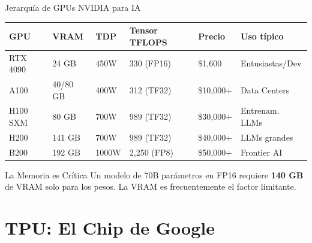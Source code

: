 \documentclass[aspectratio=169]{beamer}
\begin{document}
\begin{frame}{Jerarquía de GPUs NVIDIA para IA}
    \begin{table}[]
        \centering
        \renewcommand{\arraystretch}{1.3}
        \scriptsize
        \begin{tabular}{p{2.2cm} p{1.8cm} p{1.5cm} p{2.2cm} p{2cm} p{2cm}}
            \toprule
            \textbf{GPU} & \textbf{VRAM} & \textbf{TDP} & \textbf{Tensor TFLOPS} & \textbf{Precio} & \textbf{Uso típico} \\
            \midrule
            RTX 4090 & 24 GB & 450W & 330 (FP16) & \$1,600 & Entusiastas/Dev \\
            A100 & 40/80 GB & 400W & 312 (TF32) & \$10,000+ & Data Centers \\
            H100 SXM & 80 GB & 700W & 989 (TF32) & \$30,000+ & Entrenam. LLMs \\
            H200 & 141 GB & 700W & 989 (TF32) & \$40,000+ & LLMs grandes \\
            B200 & 192 GB & 1000W & 2,250 (FP8) & \$50,000+ & Frontier AI \\
            \bottomrule
        \end{tabular}
    \end{table}
    
    \vspace{0.3cm}
    \begin{alertblock}{La Memoria es Crítica}
        Un modelo de 70B parámetros en FP16 requiere \textbf{140 GB} de VRAM solo para los pesos. La VRAM es frecuentemente el factor limitante.
    \end{alertblock}
\end{frame}

\section{TPU: El Chip de Google}
\end{document}

